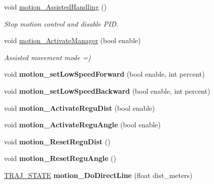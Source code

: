 \begin{DoxyCompactItemize}
void \hyperlink{classAsservDriver__LegoAngle_a86b335e94ff1df802eb9161ff68e6e5b}{motion\+\_\+\+Assisted\+Handling} ()
\begin{DoxyCompactList}\small\item\em Stop motion control and disable P\+ID. \end{DoxyCompactList}\item 
\mbox{\label{classAsservDriver__LegoAngle_a082d6c03ecf7b81b8ccac55b1db9eda7}} 
void \hyperlink{classAsservDriver__LegoAngle_a082d6c03ecf7b81b8ccac55b1db9eda7}{motion\+\_\+\+Activate\+Manager} (bool enable)
\begin{DoxyCompactList}\small\item\em Assisted movement mode =) \end{DoxyCompactList}\item 
\mbox{\label{classAsservDriver__LegoAngle_aeb3809ae2718ad327a5874c04e28ae9d}} 
void {\bfseries motion\+\_\+set\+Low\+Speed\+Forward} (bool enable, int percent)
\item 
\mbox{\label{classAsservDriver__LegoAngle_a71eaad73c95e90ca87ec0a14edf54af1}} 
void {\bfseries motion\+\_\+set\+Low\+Speed\+Backward} (bool enable, int percent)
\item 
\mbox{\label{classAsservDriver__LegoAngle_a9bc3497470fcdec7ead0b5931c604b12}} 
void {\bfseries motion\+\_\+\+Activate\+Regu\+Dist} (bool enable)
\item 
\mbox{\label{classAsservDriver__LegoAngle_adb11b50799604d27d3d5ad71fde51dc4}} 
void {\bfseries motion\+\_\+\+Activate\+Regu\+Angle} (bool enable)
\item 
\mbox{\label{classAsservDriver__LegoAngle_aaf20757247281d43a405aacf4fdd226e}} 
void {\bfseries motion\+\_\+\+Reset\+Regu\+Dist} ()
\item 
\mbox{\label{classAsservDriver__LegoAngle_aa8c3b07d19c31db4cab87d23d3f1f646}} 
void {\bfseries motion\+\_\+\+Reset\+Regu\+Angle} ()
\item 
\mbox{\label{classAsservDriver__LegoAngle_a9095a6ed6f88374ffb721889b321e61b}} 
\hyperlink{path__manager_8h_adb3360abeb29758da93865c8afcb80eb}{T\+R\+A\+J\+\_\+\+S\+T\+A\+TE} {\bfseries motion\+\_\+\+Do\+Direct\+Line} (float dist\+\_\+meters)
\end{DoxyCompactItemize}
